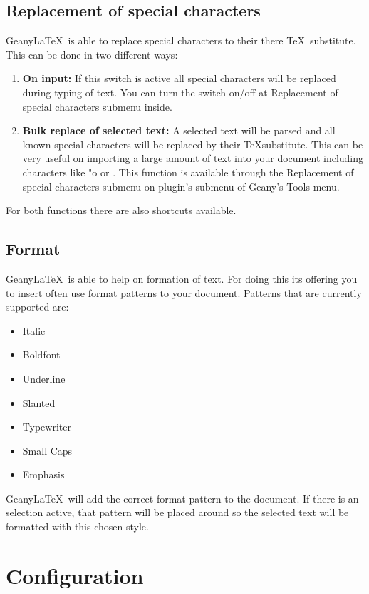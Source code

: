 \documentclass[%
a4paper,%
10pt,%
oneside,%
DIV18,
headsepline,
plainheadsepline,
footsepline,
plainfootsepline,
bibtotoc,%
liststotoc,%
BCOR12mm,%
halfparskip,%
openany,%
]{scrartcl}
\begin{document}
\subsection{Replacement of special characters}
Geany\LaTeX\ is able to replace special characters to their there \TeX\
substitute. This can be done in two different ways:

\begin{enumerate}
	\item \textbf{On input:} If this switch is active all special
		  characters will be replaced during typing of text. You can
		  turn the switch on/off at Replacement of special characters
		  submenu inside.
	\item \textbf{Bulk replace of selected text:}
		  A selected text will be parsed and all known special characters
		  will be replaced by their \TeX substitute. This can be very useful
		  on importing a large amount of text into your document
		  including characters like "o or \frqq. This function is
		  available through the Replacement of special characters
		  submenu on plugin's submenu of Geany's Tools menu.
\end{enumerate}

For both functions there are also shortcuts available.

\subsection{Format}
Geany\LaTeX\ is able to help on formation of text. For doing this its
offering you to insert often use format patterns to your document.
Patterns that are currently supported are:

\begin{itemize}
	\item Italic
	\item Boldfont
	\item Underline
	\item Slanted
	\item Typewriter
	\item Small Caps
	\item Emphasis
\end{itemize}

Geany\LaTeX\ will add the correct format pattern to the document. If
there is an selection active, that pattern will be placed around so
the selected text will be formatted with this chosen style.

\section{Configuration}
\end{document}

